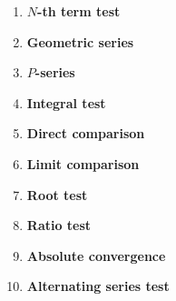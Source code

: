 \documentclass{article}
\begin{document}
\begin{enumerate}
\item \textbf{$N$-th term test}
\item \textbf{Geometric series}
\item \textbf{$P$-series}
\item \textbf{Integral test}
\item \textbf{Direct comparison}
\item \textbf{Limit comparison}
\item \textbf{Root test}
\item \textbf{Ratio test}
\item \textbf{Absolute convergence}
\item \textbf{Alternating series test}
\end{enumerate}
\end{document}
